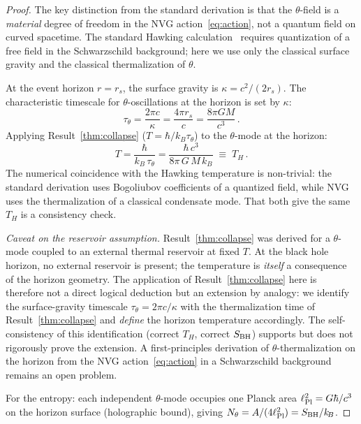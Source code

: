 \documentclass[12pt,a4paper]{article}
\theoremstyle{plain}
\theoremstyle{definition}
\theoremstyle{remark}
\newcommand{\hb}{\hbar}
\newcommand{\kB}{k_{\!B}}
\begin{document}
\begin{proof}
The key distinction from the standard derivation is that
the $\theta$-field is a \emph{material} degree of freedom
in the NVG action~\eqref{eq:action}, not a quantum field
on curved spacetime.  The standard Hawking
calculation~\cite{Hawking1975} requires quantization of a
free field in the Schwarzschild background; here we use
only the classical surface gravity and the classical
thermalization of $\theta$.

At the event horizon $r = r_s$, the surface gravity is
$\kappa = c^2/(2r_s)$.  The characteristic timescale for
$\theta$-oscillations at the horizon is set by $\kappa$:
\begin{equation}
  \tau_\theta
  = \frac{2\pi c}{\kappa}
  = \frac{4\pi r_s}{c}
  = \frac{8\pi G M}{c^3}\,.
\end{equation}
Applying Result~\ref{thm:collapse}
($T = \hb/\kB\tau_\theta$) to the $\theta$-mode at the
horizon:
\begin{equation}
  T = \frac{\hb}{\kB\,\tau_\theta}
  = \frac{\hb\, c^3}{8\pi\, G\, M\, \kB}
  \;\equiv\; T_H\,.
\end{equation}
The numerical coincidence with the Hawking
temperature is non-trivial: the standard derivation uses
Bogoliubov coefficients of a quantized field, while NVG
uses the thermalization of a classical condensate mode.
That both give the same $T_H$ is a consistency check.

\emph{Caveat on the reservoir assumption.}
Result~\ref{thm:collapse} was derived for a $\theta$-mode
coupled to an external thermal reservoir at fixed $T$.
At the black hole horizon, no external reservoir is present;
the temperature is \emph{itself} a consequence of the
horizon geometry.  The application of Result~\ref{thm:collapse}
here is therefore not a direct logical deduction but an
extension by analogy: we identify the surface-gravity
timescale $\tau_\theta = 2\pi c/\kappa$ with the
thermalization time of Result~\ref{thm:collapse} and
\emph{define} the horizon temperature accordingly.
The self-consistency of this identification (correct $T_H$,
correct $S_{\rm BH}$) supports but does not rigorously
prove the extension.  A first-principles derivation of
$\theta$-thermalization on the horizon from the NVG
action~\eqref{eq:action} in a Schwarzschild background
remains an open problem.

For the entropy: each independent $\theta$-mode occupies one
Planck area $\ell_{\rm Pl}^2 = G\hb/c^3$ on the horizon surface
(holographic bound), giving
$N_\theta = A/(4\ell_{\rm Pl}^2) = S_{\rm BH}/\kB$.


\end{proof}
\end{document}

